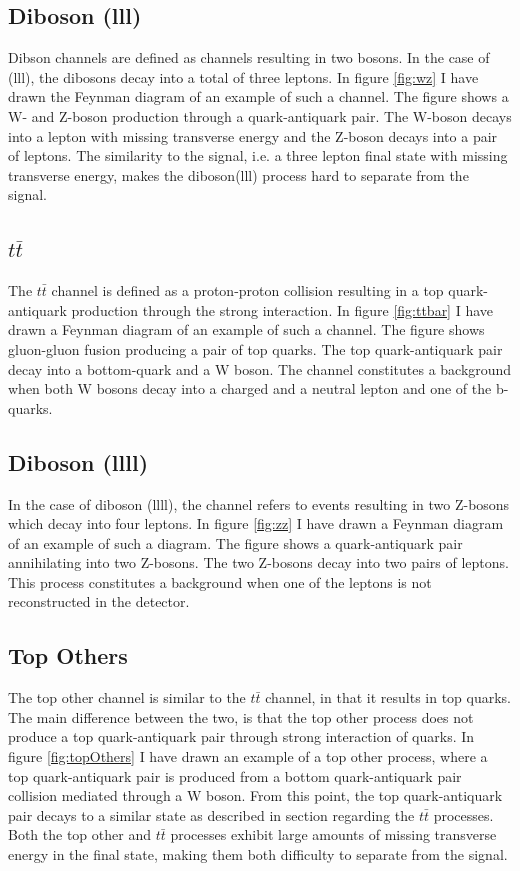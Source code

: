 \subsection*{Diboson (lll)}
Dibson channels are defined as channels resulting in two bosons. In the case of (lll), the dibosons
decay into a total of three leptons. In figure \ref{fig:wz} I have drawn the Feynman diagram of an 
example of such a channel. The figure shows a W- and Z-boson production through a quark-antiquark pair.
The W-boson decays into a lepton with missing transverse energy and the Z-boson decays into a pair of leptons.
The similarity to the signal, i.e. a three lepton final state with missing transverse energy, makes the diboson(lll)
process hard to separate from the signal.  

\subsection*{$t\bar{t}$}\label{subsec:ttbar}
The $t\bar{t}$ channel is defined as a proton-proton collision resulting in a top quark-antiquark production 
through the strong interaction. In figure \ref{fig:ttbar} I have drawn a Feynman diagram of an example of such 
a channel. The figure shows gluon-gluon fusion producing a pair of top quarks. The top quark-antiquark pair decay into 
a bottom-quark and a W boson. The channel constitutes a background when both W bosons decay into a charged and a 
neutral lepton and one of the b-quarks.

\subsection*{Diboson (llll)}
In the case of diboson (llll), the channel refers to events resulting in two Z-bosons which decay 
into four leptons. In figure \ref{fig:zz} I have drawn a Feynman diagram of an example of 
such a diagram. The figure shows a quark-antiquark pair annihilating into two Z-bosons.
The two Z-bosons decay into two pairs of leptons. This process constitutes a background when one 
of the leptons is not reconstructed in the detector.

\subsection*{Top Others}
The top other channel is similar to the $t\bar{t}$ channel, in that it results in top quarks. The main difference between 
the two, is that the top other process does not produce a top quark-antiquark pair through strong interaction of quarks. 
In figure \ref{fig:topOthers} I have drawn an example of a top other process, where a top quark-antiquark pair is produced 
from a bottom quark-antiquark pair collision mediated through a W boson. From this point, the top quark-antiquark pair decays 
to a similar state as described in section regarding the $t\bar{t}$ processes. Both the top other and $t\bar{t}$ processes exhibit
large amounts of missing transverse energy in the final state, making them both difficulty to separate from the signal. 

